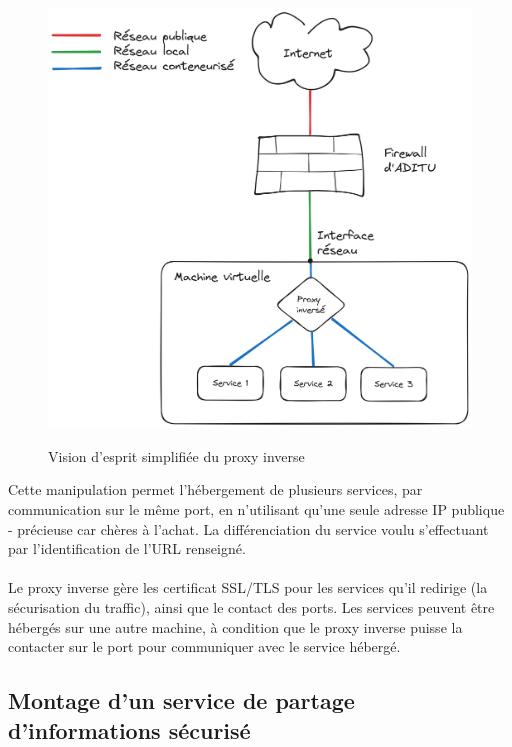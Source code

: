 \begin{figure}[H]
    \centering
    \includegraphics[width=\textwidth - \textwidth / 6]{Untitled-2024-01-21-1259.png}
    \figurename
    \caption{Vision d'esprit simplifiée du proxy inverse}
    \label{fig:rvproxy}
\end{figure}

\noindent Cette manipulation permet l'hébergement de plusieurs services, par communication sur le même port, en n'utilisant qu'une seule adresse IP publique - précieuse car chères à l'achat. La différenciation du service voulu s'effectuant par l'identification de l'URL renseigné.
\\ \\
Le proxy inverse gère les certificat SSL/TLS pour les services qu'il redirige (la sécurisation du traffic), ainsi que le contact des ports. Les services peuvent être hébergés sur une autre machine, à condition que le proxy inverse puisse la contacter sur le port pour communiquer avec le service hébergé.


\subsection{Montage d'un service de partage d'informations sécurisé}

